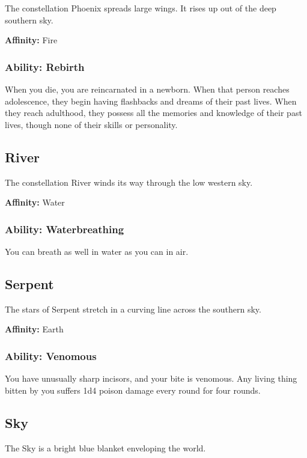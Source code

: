 \begin{multicols}{2}
The constellation Phoenix spreads large wings. It rises up out of the
deep southern sky.

\textbf{Affinity:} Fire

\subsubsection{Ability: Rebirth}

When you die, you are reincarnated in a newborn. When that person
reaches adolescence, they begin having flashbacks and dreams of their
past lives. When they reach adulthood, they possess all the memories
and knowledge of their past lives, though none of their skills or personality.

\subsection{River}

The constellation River winds its way through the low western sky.

\textbf{Affinity:} Water

\subsubsection{Ability: Waterbreathing}

You can breath as well in water as you can in air.

\subsection{Serpent}

The stars of Serpent stretch in a curving line across the
southern sky.

\textbf{Affinity:} Earth

\subsubsection{Ability: Venomous}

You have unusually sharp incisors, and your bite is venomous. Any
living thing bitten by you suffers 1d4 poison damage every round for
four rounds.

\subsection{Sky}

The Sky is a bright blue blanket enveloping the world.


\end{multicols}
